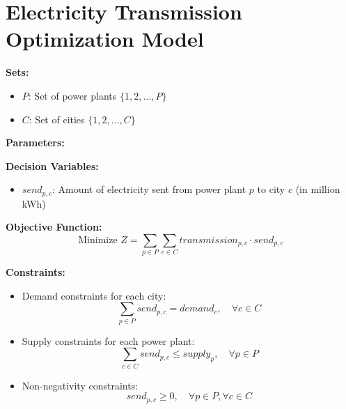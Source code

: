 \documentclass{article}
\begin{document}
\section*{Electricity Transmission Optimization Model}

\textbf{Sets:}
\begin{itemize}
    \item \( P \): Set of power plants \( \{1, 2, \ldots, P\} \)
    \item \( C \): Set of cities \( \{1, 2, \ldots, C\} \)
\end{itemize}

\textbf{Parameters:}

\textbf{Decision Variables:}
\begin{itemize}
    \item \( send_{p,c} \): Amount of electricity sent from power plant \( p \) to city \( c \) (in million kWh)
\end{itemize}

\textbf{Objective Function:}
\[
\text{Minimize } Z = \sum_{p \in P} \sum_{c \in C} transmission_{p,c} \cdot send_{p,c}
\]

\textbf{Constraints:}
\begin{itemize}
    \item Demand constraints for each city:
    \[
    \sum_{p \in P} send_{p,c} = demand_{c}, \quad \forall c \in C
    \]
    
    \item Supply constraints for each power plant:
    \[
    \sum_{c \in C} send_{p,c} \leq supply_{p}, \quad \forall p \in P
    \]
    
    \item Non-negativity constraints:
    \[
    send_{p,c} \geq 0, \quad \forall p \in P, \forall c \in C
    \]
\end{itemize}
\end{document}
